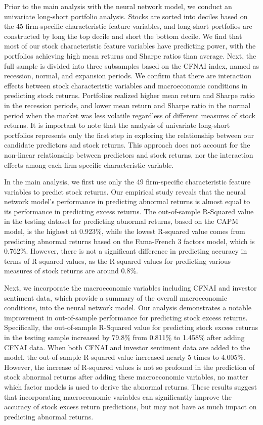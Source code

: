 Prior to the main analysis with the neural network model, we conduct an univariate long-short portfolio analysis. Stocks are sorted into deciles based on the 45 firm-specific characteristic feature variables, and long-short portfolios are constructed by long the top decile and short the bottom decile. We find that most of our stock characteristic feature variables have predicting power, with the portfolios achieving high mean returns and Sharpe ratios than average. Next, the full sample is divided into three subsamples based on the CFNAI index, named as recession, normal, and expansion periods. We confirm that there are interaction effects between stock characteristic variables and macroeconomic conditions in predicting stock returns. Portfolios realized higher mean return and Sharpe ratio in the recession periods, and lower mean return and Sharpe ratio in the normal period when the market was less volatile regardless of different measures of stock returns. It is important to note that the analysis of univariate long-short portfolios represents only the first step in exploring the relationship between our candidate predictors and stock returns. This approach does not account for the non-linear relationship between predictors and stock returns, nor the interaction effects among each firm-specific characteristic variable.

In the main analysis, we first use only the 49 firm-specific characteristic feature variables to predict stock returns. Our empirical study reveals that the neural network model's performance in predicting abnormal returns is almost equal to its performance in predicting excess returns. The out-of-sample R-Squared value in the testing dataset for predicting abnormal returns, based on the CAPM model, is the highest at 0.923\%, while the lowest R-squared value comes from predicting abnormal returns based on the Fama-French 3 factors model, which is 0.762\%. However, there is not a significant difference in predicting accuracy in terms of R-squared values, as the R-squared values for predicting various measures of stock returns are around 0.8\%.

Next, we incorporate the macroeconomic variables including CFNAI and investor sentiment data, which provide a summary of the overall macroeconomic conditions, into the neural network model. Our analysis demonstrates a notable improvement in out-of-sample performance for predicting stock excess returns. Specifically, the out-of-sample R-Squared value for predicting stock excess returns in the testing sample increased by 79.8\% from 0.811\% to 1.458\% after adding CFNAI data. When both CFNAI and investor sentiment data are added to the model, the out-of-sample R-squared value increased nearly 5 times to 4.005\%. However, the increase of R-squared values is not so profound in the prediction of stock abnormal returns after adding these macroeconomic variables, no matter which factor models is used to derive the abnormal returns. These results suggest that incorporating macroeconomic variables can significantly improve the accuracy of stock excess return predictions, but may not have as much impact on predicting abnormal returns.

